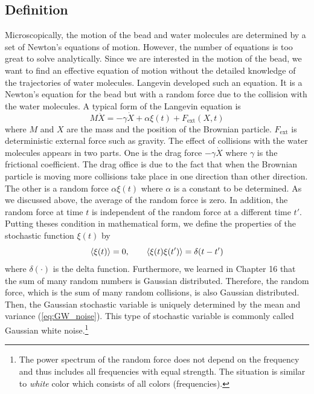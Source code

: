 \subsection{Definition}
Microscopically, the motion of the bead and water molecules are determined by a set of Newton's equations of motion.  However, the number of equations is too great to solve analytically.  Since we are interested in the motion of the bead, we want to find an effective equation of motion without the detailed knowledge of the trajectories of water molecules.  Langevin developed such an equation. It is a Newton's equation for the bead but with a random force due to the collision with the water molecules. A typical form of the Langevin equation is
\begin{equation}\label{eq:langevin}
M \ddot{X} = -\gamma \dot{X} +  \alpha \xi(t) + F_\text{ext}(X,t)
\end{equation}
where $M$ and $X$ are the mass and the position of the Brownian particle.  $F_\text{ext}$ is deterministic external force such as gravity. The effect of collisions with the water molecules appears in two parts.  One is the drag force $-\gamma \dot{X}$ where $\gamma$ is the frictional coefficient. The drag office is due to the fact that when the Brownian particle is moving more collisions take place in one direction than other direction.  The other is a random force $\alpha \xi(t)$ where $\alpha$ is a constant to be determined.  As we discussed above, the average of the random force is zero.  In addition, the random force at time $t$ is independent of the random force at a different time $t'$.  Putting theses condition in mathematical form, we define the properties of the stochastic function $\xi(t)$ by
\begin{equation}\label{eq:GW_noise}
\langle \xi(t) \rangle=0, \qquad \langle \xi(t) \xi(t') \rangle = \delta(t-t')
\end{equation}
where $\delta(\cdot)$ is the delta function.  Furthermore, we learned in Chapter 16 that the sum of many random numbers is Gaussian distributed.  
Therefore, the random force, which is the sum of many random collisions, is also Gaussian distributed.  Then, the Gaussian stochastic variable is uniquely determined by the mean and variance (\ref{eq:GW_noise}).  This type of stochastic variable is commonly called Gaussian white noise.\footnote{The power spectrum of the random force does not depend on the frequency and thus includes all frequencies with equal strength.  The situation is similar to \textit{white} color which consists of all colors (frequencies).}

